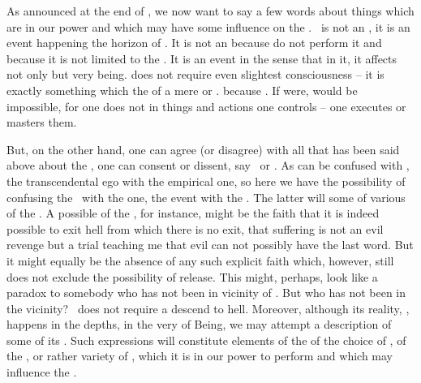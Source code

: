 
\label{sub:reflYes}%
\pa
As announced at the end of
, we now want to say a few words about things which are in our
power and which may have some influence on the \sch. 
\Yes\ is not an , it is an event happening  the horizon of
. It is not an  because  do not perform it and because
it is not limited to the \hoa. It is an event in the sense that 
 in it, it affects not only  but  very
being.  does not require 
even slightest  consciousness -- it is exactly something which
 the  of a mere  or .  because . If  were,
 would be impossible, for one does not  in
things and actions one controls -- one executes or masters them.

But, on the other hand, one can agree (or disagree) with all that has been said
above about the , one can  consent or dissent,
 say \Yes\ or \No. As  can be confused with
, the transcendental ego with the empirical one, so here we have the
possibility of confusing the \sch\ with the  one, the event with the
. The latter will  some  of various
 of the \sch.  A possible  of the ,
for instance, might be the  faith that it is indeed possible to exit
hell from which there is no exit, that suffering is not an evil revenge but a trial
teaching me that evil can not possibly have the last word. But it might equally
be the absence of any such explicit 
faith which, however, still does not exclude the possibility of release.
This might, perhaps, look like a paradox to somebody who has not been in
vicinity of .  But who has not been in the vicinity?  \Yes\ does
not require a descend to hell.  Moreover, although its reality, ,
happens in the  depths, in the very  of Being, we may
attempt a  description of some of its .  Such
 expressions will constitute elements of the  
of the choice of \yes, of the , or rather variety of , which it
is in our power to perform and which may influence the .

